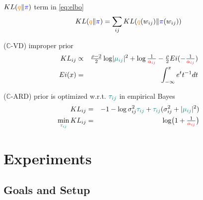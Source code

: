 \documentclass{beamer}
\newcommand{\real}{\mathbb{R}}
\newcommand{\cplx}{\mathbb{C}}
\begin{document}
\begin{frame}[c]{\insertsection}

  $\mathop{KL}({\color{orange} q} \| {\color{blue} \pi})$ term in \eqref{eq:elbo}
  \begin{equation*}
    \mathop{KL}({\color{orange} q} \| {\color{blue} \pi})
      = \sum_{ij} \mathop{KL}({\color{orange} q}(w_{ij}) \| {\color{blue} \pi}(w_{ij}))
  \end{equation*}

  \bigskip
  ($\cplx$-VD) improper prior
  \begin{eqnarray*}
    \mathop{KL}\nolimits_{ij}
      &\propto&
        \tfrac{\rho - 2}2 \log \lvert {\color{teal} \mu_{ij}} \rvert^2
        + \log \tfrac1{{\color{red} \alpha_{ij}}}
        - \tfrac\rho2 Ei( - \tfrac1{{\color{red} \alpha_{ij}}})
      \\
    Ei(x) &=& \int_{-\infty}^x e^t t^{-1} dt
  \end{eqnarray*}

  \bigskip
  ($\cplx$-ARD) prior is optimized w.r.t. ${\color{teal} \tau_{ij}}$ in empirical Bayes
  \begin{eqnarray*}
    \mathop{KL}\nolimits_{ij}
      &=& -1
        - \log \sigma^2_{ij} {\color{teal} \tau_{ij}}
        + {\color{teal} \tau_{ij}} (\sigma^2_{ij} + \lvert {\color{teal} \mu_{ij}} \rvert^2)
      \\
    \min_{{\color{teal} \tau_{ij}}} \mathop{KL}\nolimits_{ij}
      &=& \log \bigl( 1 + \tfrac1{{\color{red} \alpha_{ij}}} \bigr)
  \end{eqnarray*}

\end{frame}



\section{Experiments} %
\label{sec:experiments}

\subsection{Goals and Setup} %
\label{sub:goals}
\end{document}
